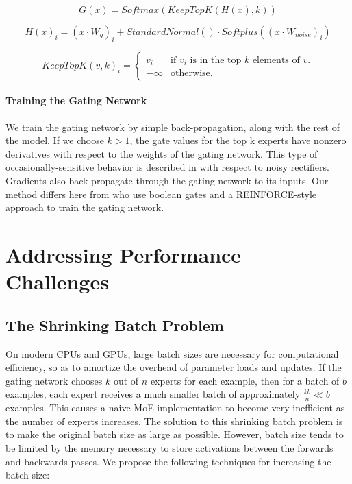 \documentclass{article}
\begin{document}
\begin{equation}\label{eq:g}
G(x) = Softmax(KeepTopK(H(x), k))
\end{equation}

\begin{equation}\label{eq:noise}
H(x)_i = (x \cdot W_g)_i + StandardNormal() \cdot Softplus((x \cdot W_{noise})_i)
\end{equation}

\begin{equation}\label{eq:keeptopk}
KeepTopK(v, k)_i = \begin{cases}
            v_i & \text{if $v_i$ is in the top $k$ elements of $v$.} \\
            -\infty & \text{otherwise.}
        \end{cases}
\end{equation}

\paragraph{Training the Gating Network}
We train the gating network by simple back-propagation, along with the rest of the model.  If we choose $k>1$, the gate values for the top k experts have nonzero derivatives with respect to the weights of the gating network.  This type of occasionally-sensitive behavior is described in \citep{Bengio13:CondComp} with respect to noisy rectifiers.  Gradients also back-propagate through the gating network to its inputs.   Our method differs here from \citep{Bengio15:CondComp} who use boolean gates and a REINFORCE-style approach to train the gating network. 

\section{Addressing Performance Challenges}
\label{sec:performance}
\subsection{The Shrinking Batch Problem}
On modern CPUs and GPUs, large batch sizes are necessary for computational efficiency, so as to amortize the overhead of parameter loads and updates.  If the gating network chooses $k$ out of $n$ experts for each example, then for a batch of $b$ examples, each expert receives a much smaller batch of approximately $\frac{kb}{n}\ll b$ examples.  This causes a naive MoE implementation to become very inefficient as the number of experts increases.  The solution to this shrinking batch problem is to make the original batch size as large as possible.  However, batch size tends to be limited by the memory necessary to store activations between the forwards and backwards passes.  We propose the following techniques for increasing the batch size:
\end{document}
